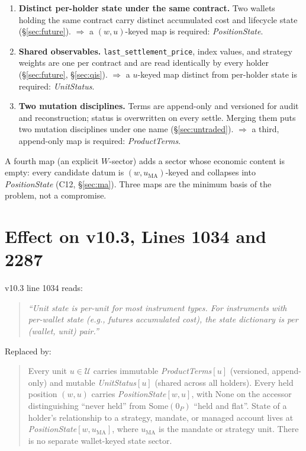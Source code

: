 \documentclass[11pt,a4paper]{article}
\begin{document}
\begin{enumerate}[leftmargin=*]
\item \textbf{Distinct per-holder state under the same contract.} Two wallets holding the
same contract carry distinct accumulated cost and lifecycle state (\S\ref{sec:future}).
$\Rightarrow$ a $(w,u)$-keyed map is required: \emph{PositionState}.
\item \textbf{Shared observables.} \texttt{last\_settlement\_price}, index values, and
strategy weights are one per contract and are read identically by every holder
(\S\ref{sec:future}, \S\ref{sec:qis}). $\Rightarrow$ a $u$-keyed map distinct from
per-holder state is required: \emph{UnitStatus}.
\item \textbf{Two mutation disciplines.} Terms are append-only and versioned for audit and
reconstruction; status is overwritten on every settle. Merging them puts two mutation
disciplines under one name (\S\ref{sec:untraded}). $\Rightarrow$ a third, append-only map is
required: \emph{ProductTerms}.
\end{enumerate}

\noindent A fourth map (an explicit $W$-sector) adds a sector whose economic content is
empty: every candidate datum is $(w,u_{\mathrm{MA}})$-keyed and collapses into
\emph{PositionState} (C12, \S\ref{sec:ma}). Three maps are the minimum basis of the problem,
not a compromise.

\section{Effect on v10.3, Lines 1034 and 2287}
\label{sec:line1034}

v10.3 line 1034 reads:

\begin{quote}
\textit{``Unit state is per-unit for most instrument types. For instruments with per-wallet
state (e.g., futures accumulated cost), the state dictionary is per (wallet, unit) pair.''}
\end{quote}

\noindent Replaced by:

\begin{quote}
Every unit $u\in\mathcal{U}$ carries immutable \emph{ProductTerms}$[u]$ (versioned,
append-only) and mutable \emph{UnitStatus}$[u]$ (shared across all holders). Every held
position $(w,u)$ carries \emph{PositionState}$[w,u]$, with $\mathrm{None}$ on the accessor
distinguishing ``never held'' from $\mathrm{Some}(0_P)$ ``held and flat''. State of a
holder's relationship to a strategy, mandate, or managed account lives at
\emph{PositionState}$[w,u_{\mathrm{MA}}]$, where $u_{\mathrm{MA}}$ is the mandate or strategy
unit. There is no separate wallet-keyed state sector.
\end{quote}
\end{document}
